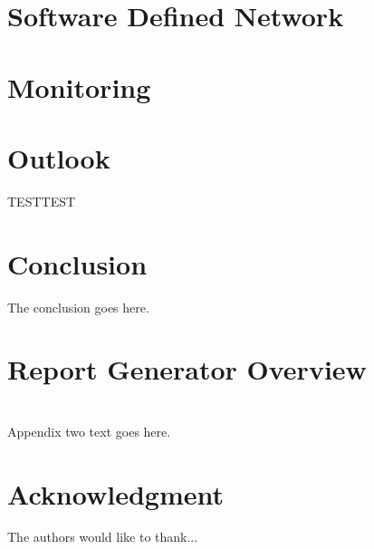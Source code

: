 \documentclass[journal]{IEEEtran}
\begin{document}




\section{Software Defined Network}





\section{Monitoring}









\section{Outlook}



TESTTEST



\section{Conclusion}

The conclusion goes here.







\appendices

\section{Report Generator Overview}





\section{}

Appendix two text goes here.






\section*{Acknowledgment}

The authors would like to thank...

\ifCLASSOPTIONcaptionsoff

  \newpage

\fi





\printbibliography
\end{document}
